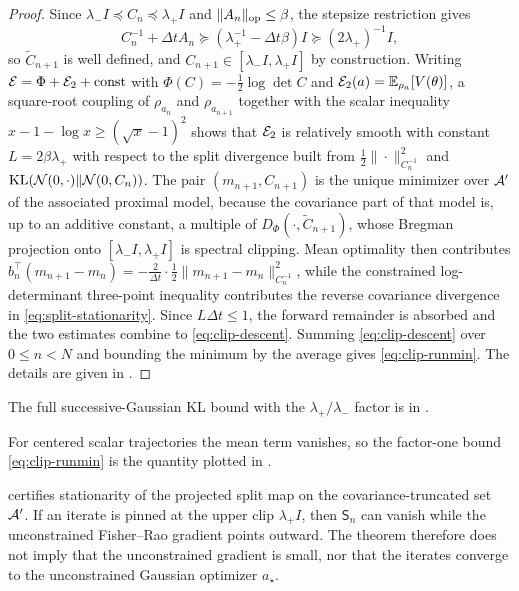 \begin{proof}
    Since $\lambda_- I \preceq C_n \preceq \lambda_+ I$ and $\| A_n \|_{\mathrm{op}} \leq \beta$, the stepsize restriction gives
    \begin{equation*}
        C_n^{-1} + \Delta t A_n \succeq (\lambda_+^{-1} - \Delta t \beta) I \succeq (2 \lambda_+)^{-1} I,
    \end{equation*}
    so $\widetilde{C}_{n+1}$ is well defined, and $C_{n+1} \in [\lambda_- I, \lambda_+ I]$ by construction. Writing $\mathcal{E} = \Phi + \mathcal{E}_2 + \mathrm{const}$ with $\Phi (C) = -\frac{1}{2} \log \det C$ and $\mathcal{E}_2 (a) = \mathbb{E}_{\rho_a} [V (\theta)]$, a square-root coupling of $\rho_{a_n}$ and $\rho_{a_{n+1}}$ together with the scalar inequality $x - 1 - \log x \geq (\sqrt{x} - 1)^2$ shows that $\mathcal{E}_2$ is relatively smooth with constant $L = 2 \beta \lambda_+$ with respect to the split divergence built from $\frac12 \| \cdot \|_{C_n^{-1}}^2$ and $\mathrm{KL} (\mathcal{N} (0, \cdot) \| \mathcal{N} (0, C_n))$. The pair $(m_{n+1}, C_{n+1})$ is the unique minimizer over $\mathcal{A}'$ of the associated proximal model, because the covariance part of that model is, up to an additive constant, a multiple of $D_\Phi (\cdot, \widetilde{C}_{n+1})$, whose Bregman projection onto $[\lambda_- I, \lambda_+ I]$ is spectral clipping. Mean optimality then contributes $b_n^\top (m_{n+1} - m_n) = -\frac{2}{\Delta t} \cdot \frac12 \| m_{n+1} - m_n \|_{C_n^{-1}}^2$, while the constrained log-determinant three-point inequality contributes the reverse covariance divergence in \eqref{eq:split-stationarity}. Since $L \Delta t \leq 1$, the forward remainder is absorbed and the two estimates combine to \eqref{eq:clip-descent}. Summing \eqref{eq:clip-descent} over $0 \leq n < N$ and bounding the minimum by the average gives \eqref{eq:clip-runmin}. The details are given in .
\end{proof}

The full successive-Gaussian KL bound with the $\lambda_+/\lambda_-$ factor is
 in .

For centered scalar trajectories the mean term vanishes, so the factor-one bound \eqref{eq:clip-runmin} is the quantity plotted in .

 certifies stationarity of the projected split map on the covariance-truncated set $\mathcal{A}'$. If an iterate is pinned at the upper clip $\lambda_+ I$, then $\mathsf{S}_n$ can vanish while the unconstrained Fisher--Rao gradient points outward. The theorem therefore does not imply that the unconstrained gradient is small, nor that the iterates converge to the unconstrained Gaussian optimizer $a_\star$.

